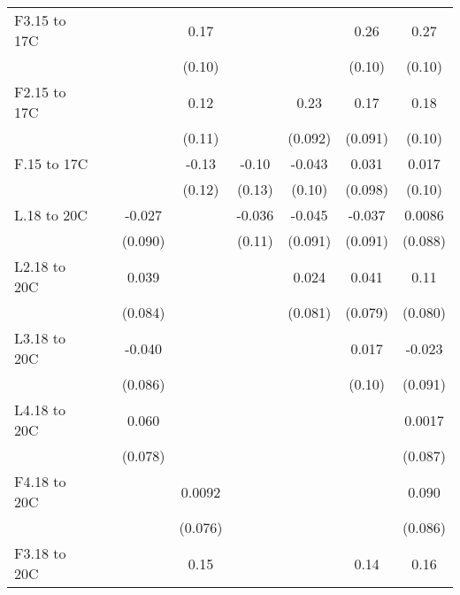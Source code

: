 \documentclass[paper=letterpaper, fontsize=11pt]{article} %
\begin{document}
{\begin{landscape}
\begin{longtable}{l*{7}{c}}
F3.15 to 17C        &            &            &        0.17&            &            &        0.26&        0.27\\
                    &            &            &      (0.10)&            &            &      (0.10)&      (0.10)\\
F2.15 to 17C        &            &            &        0.12&            &        0.23&        0.17&        0.18\\
                    &            &            &      (0.11)&            &     (0.092)&     (0.091)&      (0.10)\\
F.15 to 17C         &            &            &       -0.13&       -0.10&      -0.043&       0.031&       0.017\\
                    &            &            &      (0.12)&      (0.13)&      (0.10)&     (0.098)&      (0.10)\\
L.18 to 20C         &            &      -0.027&            &      -0.036&      -0.045&      -0.037&      0.0086\\
                    &            &     (0.090)&            &      (0.11)&     (0.091)&     (0.091)&     (0.088)\\
L2.18 to 20C        &            &       0.039&            &            &       0.024&       0.041&        0.11\\
                    &            &     (0.084)&            &            &     (0.081)&     (0.079)&     (0.080)\\
L3.18 to 20C        &            &      -0.040&            &            &            &       0.017&      -0.023\\
                    &            &     (0.086)&            &            &            &      (0.10)&     (0.091)\\
L4.18 to 20C        &            &       0.060&            &            &            &            &      0.0017\\
                    &            &     (0.078)&            &            &            &            &     (0.087)\\
F4.18 to 20C        &            &            &      0.0092&            &            &            &       0.090\\
                    &            &            &     (0.076)&            &            &            &     (0.086)\\
F3.18 to 20C        &            &            &        0.15&            &            &        0.14&        0.16\\

\end{longtable}
\end{landscape}}
\end{document}
